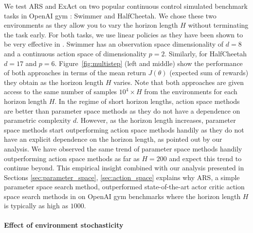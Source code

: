 We test ARS and ExAct on two popular continuous control simulated
benchmark tasks in OpenAI gym \citep{openaigym}: Swimmer and
HalfCheetah. We chose these two environments as they allow you to vary
the horizon length $H$ without terminating the task early. For both
tasks, we use linear policies as they have been shown to be very
effective in \citep{mania2018simple, rajeswaran2017towards}. Swimmer
has an observation space dimensionality of $d = 8$ and a continuous
action space of dimensionality $p = 2$. Similarly, for HalfCheetah
$d=17$ and $p=6$. Figure~\ref{fig:multistep} (left and middle) show the
performance of both approaches in terms of the mean return $J(\theta)$ (expected sum of
rewards) they obtain as the horizon length $H$ varies. 
%
%
%
Note that both
approaches are given access to the same number of samples $10^4 \times
H$ from the environments for each horizon length $H$. In the regime of
short horizon lengths, action space methods are better than parameter
space methods as they do not have a dependence on parametric
complexity $d$. However, as the horizon length increases, parameter
space methods start outperforming action space methods handily as they
do not have an explicit dependence on the horizon length, as pointed out
by our analysis. We have observed the same trend of parameter space
methods handily outperforming action space methods as far as $H =
200$ and expect this trend to continue beyond. This empirical insight
combined with our analysis presented in 
Sections \ref{sec:parameter_space}, \ref{sec:action_space} explains
why ARS, a simple parameter space search method, outperformed
state-of-the-art actor critic action space search methods in
\citep{mania2018simple} on OpenAI gym benchmarks where the horizon
length $H$ is typically as high as $1000$. 
%
\paragraph{Effect of environment stochasticity}
\label{sec:effect-stoch-param}

